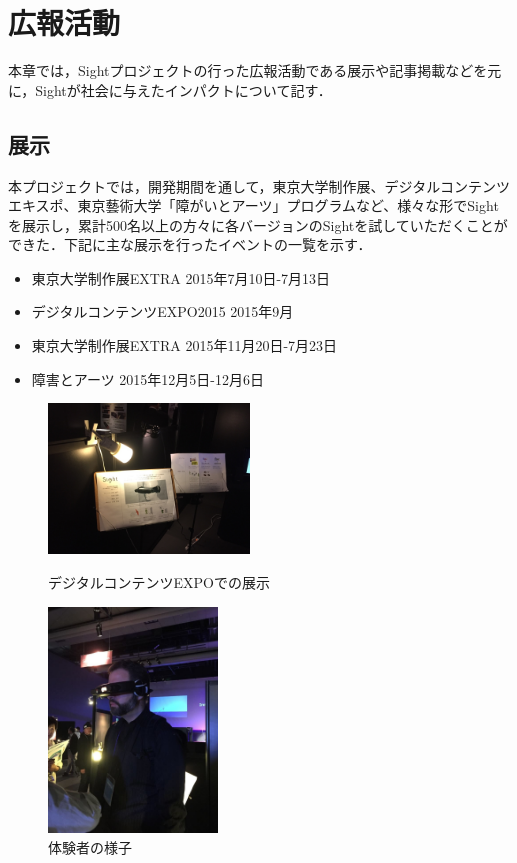 \section{広報活動}

本章では，Sightプロジェクトの行った広報活動である展示や記事掲載などを元に，Sightが社会に与えたインパクトについて記す．


\subsection{展示}

本プロジェクトでは，開発期間を通して，東京大学制作展、デジタルコンテンツエキスポ、東京藝術大学「障がいとアーツ」プログラムなど、様々な形でSightを展示し，累計500名以上の方々に各バージョンのSightを試していただくことができた．下記に主な展示を行ったイベントの一覧を示す．

\begin{itemize}
 \item 東京大学制作展EXTRA 2015年7月10日-7月13日
 \item デジタルコンテンツEXPO2015 2015年9月
 \item 東京大学制作展EXTRA 2015年11月20日-7月23日
 \item 障害とアーツ 2015年12月5日-12月6日
\end{itemize}


\begin{figure}[h]

\begin{minipage}{0.49\columnwidth}
\begin{center}
\includegraphics[height=40mm, bb=0 0 1024 768]{images/publicity/DCEXPO1.jpg}
\caption{デジタルコンテンツEXPOでの展示}
\end{center}
\end{minipage}
\begin{minipage}{0.49\columnwidth}
\begin{center}
\includegraphics[height=60mm, bb=0 0 768 1024]{images/publicity/DCEXPO2.jpg}
\caption{体験者の様子}
\end{center}
\end{minipage}

\end{figure}


